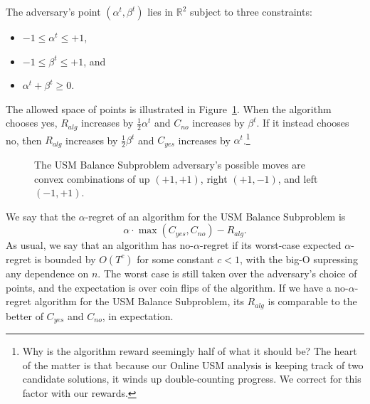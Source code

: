\documentclass[final,12pt]{colt2018}
\newcommand{\BalanceSubproblem}{USM Balance Subproblem}
\newcommand{\OnlineUSM}{Online USM}
\newcommand{\RewardAlg}{R_{alg}}
\newcommand{\CostYes}{C_{yes}}
\newcommand{\CostNo}{C_{no}}
\begin{document}
The adversary's point $(\alpha^t, \beta^t)$ lies in $\mathbb{R}^2$ subject to three constraints:
\begin{itemize}
  \item $-1 \le \alpha^t \le +1$,
  \item $-1 \le \beta^t \le +1$, and
  \item $\alpha^t + \beta^t \ge 0$.
\end{itemize}
The allowed space of points is illustrated in Figure~\ref{fig:three-moves}. When the algorithm chooses yes, $\RewardAlg$ increases by $\frac12 \alpha^t$ and $\CostNo$ increases by $\beta^t$. If it instead chooses no, then $\RewardAlg$ increases by $\frac12 \beta^t$ and $\CostYes$ increases by $\alpha^t$.\footnote{Why is the algorithm reward seemingly half of what it should be? The heart of the matter is that because our \OnlineUSM{} analysis is keeping track of two candidate solutions, it winds up double-counting progress. We correct for this factor with our rewards.}

\begin{figure}
\centering
{}
\caption{The \BalanceSubproblem{} adversary's possible moves are convex combinations of up $(+1, +1)$, right $(+1, -1)$, and left $(-1, +1)$.}
\label{fig:three-moves}
\end{figure}

We say that the $\alpha$-regret of an algorithm for the \BalanceSubproblem{} is
\[
  \alpha \cdot \max \left( \CostYes, \CostNo \right) - \RewardAlg.
\]
As usual, we say that an algorithm has no-$\alpha$-regret if its worst-case expected $\alpha$-regret is bounded by $O(T^c)$ for some constant $c < 1$, with the big-O supressing any dependence on $n$. The worst case is still taken over the adversary's choice of points, and the expectation is over coin flips of the algorithm. If we have a no-$\alpha$-regret algorithm for the \BalanceSubproblem{}, its $\RewardAlg$ is comparable to the better of $\CostYes$ and $\CostNo$, in expectation.
\end{document}
